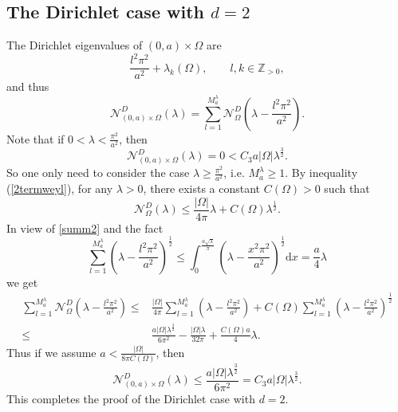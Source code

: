 \documentclass[11pt,letterpaper]{amsart}
\numberwithin{equation}{section}
\theoremstyle{plain}
\theoremstyle{plain}
\numberwithin{equation}{section}
\theoremstyle{remark}
\begin{document}
	\subsection{The Dirichlet case with $d=2$}\label{Diri,d=2}\label{subsec4.1}
	
	The Dirichlet eigenvalues of $(0,a)\times \Omega$ are 
	\begin{equation*}\label{Diri}
		\frac{l^2 \pi^2}{a^2}+ \lambda_k(\Omega), \qquad l,k\in \mathbb{Z}_{>0},
	\end{equation*}
	and thus
	\begin{equation}\label{sum}
		\mathcal N^D_{(0,a)\times \Omega}(\lambda)= \sum_{l=1}^{M_a^\lambda} \mathcal N^D_\Omega (\lambda-\frac{l^2\pi^2}{a^2}).
	\end{equation}
	Note that if $0< \lambda< \frac{\pi^2}{a^2}$, then 
	\[
	\mathcal N^D_{(0,a)\times \Omega}(\lambda)=0< C_3 a|\Omega|\lambda^{\frac{3}{2}}.
	\]
	So one only need to consider the case $\lambda\ge \frac{\pi^2}{a^2}$, i.e. $M_a^\lambda \ge 1$. By inequality (\ref{2termweyl}), for any $\lambda>0$, there exists a constant $C(\Omega)>0$ such that 
	\[
	\mathcal N^D_\Omega(\lambda)\le \frac{|\Omega|}{4\pi}\lambda+ C(\Omega)\lambda^{\frac{1}{2}}.
	\]
	In view of \eqref{summ2} and the fact 
	\[
	\sum_{l=1}^{M_a^\lambda} (\lambda-\frac{l^2\pi^2}{a^2})^{\frac{1}{2}} \le  \int_0^{\frac{a\sqrt{\lambda}}{\pi}} (\lambda- \frac{x^2\pi^2}{a^2})^{\frac{1}{2}} \mathrm{d}x = \frac{a}{4}\lambda
	\]
	we get
	\[  
	\begin{aligned}
		\sum_{l=1}^{M_a^\lambda} \mathcal N^D_\Omega (\lambda-\frac{l^2\pi^2}{a^2}) 
		\le& \frac{|\Omega|}{4\pi} \sum_{l=1}^{M_a^\lambda} (\lambda- \frac{l^2\pi^2}{a^2})+ C(\Omega) \sum_{l=1}^{M_a^\lambda} (\lambda-\frac{l^2\pi^2}{a^2})^{\frac{1}{2}}\\
		\le&   \frac{a|\Omega|\lambda^{\frac{3}{2}}}{6\pi^2}-\frac{|\Omega| \lambda}{32 \pi}+\frac{C(\Omega)a}{4}\lambda.
	\end{aligned}
	\]  
	Thus if we assume  $a<\frac{|\Omega|}{8\pi C(\Omega)}$, then 
	\[
	\mathcal N^D_{(0,a)\times \Omega}(\lambda)\le \frac{a|\Omega|\lambda^{\frac{3}{2}}}{6\pi^2}= C_3 a|\Omega|\lambda^{\frac{3}{2}}.
	\]
	This completes the proof of the Dirichlet case with $d=2$.
	
\end{document}
